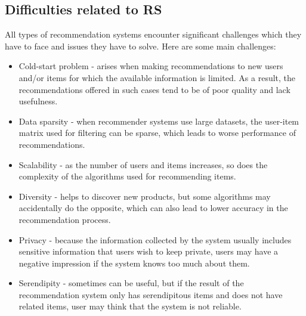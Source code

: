 \documentclass[\myFontSize,oneside,english,hidelinks,a4paper]{article}
\begin{document}
\subsection{Difficulties related to RS}
All types of recommendation systems encounter significant challenges which they have to face and issues they have to solve. Here are some main challenges:
%
\begin{itemize}
\item Cold-start problem - arises when making recommendations to new users and/or items for which the available information is limited. As a result, the recommendations offered in such cases tend to be of poor quality and lack usefulness.\cite{Al-Hassan2024a}
\item Data sparsity - when recommender systems use large datasets, the user-item matrix used for filtering can be sparse, which leads to worse performance of recommendations.
\item Scalability - as the number of users and items increases, so does the complexity of the algorithms used for recommending items.
\item Diversity - helps to discover new products, but some algorithms may accidentally do the opposite, which can also lead to lower accuracy in the recommendation process. \cite{pub.1072601078}
\item Privacy - because the information collected by the system usually includes sensitive information that users wish to keep private, users may have a negative impression if the system knows too much about them.
\item Serendipity - sometimes can be useful, but if the result of the recommendation system only has
serendipitous items and does not have related items, user may think that the system is not reliable. \cite{Aymen2022896}\\
\end{itemize}


\end{document}

